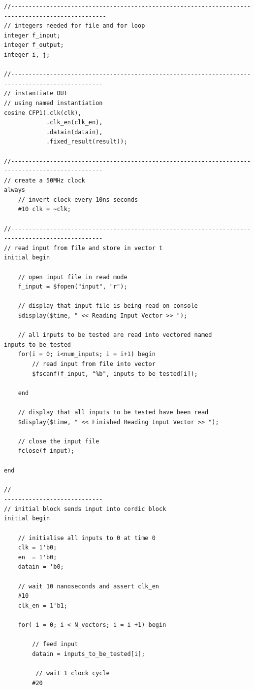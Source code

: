 \documentclass{article}
\begin{document}
\begin{verbatim}
//-------------------------------------------------------------------------------------------------
// integers needed for file and for loop
integer f_input;
integer f_output;
integer i, j;

//------------------------------------------------------------------------------------------------
// instantiate DUT
// using named instantiation
cosine CFP1(.clk(clk),
            .clk_en(clk_en),
            .datain(datain),
            .fixed_result(result));

//------------------------------------------------------------------------------------------------
// create a 50MHz clock
always
    // invert clock every 10ns seconds
    #10 clk = ~clk;
  
//------------------------------------------------------------------------------------------------
// read input from file and store in vector t
initial begin

    // open input file in read mode
    f_input = $fopen("input", "r");
    
    // display that input file is being read on console
    $display($time, " << Reading Input Vector >> ");
    
    // all inputs to be tested are read into vectored named inputs_to_be_tested
    for(i = 0; i<num_inputs; i = i+1) begin
        // read input from file into vector
        $fscanf(f_input, "%b", inputs_to_be_tested[i]);
        
    end
    
    // display that all inputs to be tested have been read
    $display($time, " << Finished Reading Input Vector >> ");
    
    // close the input file
    fclose(f_input);

end

//------------------------------------------------------------------------------------------------
// initial block sends input into cordic block
initial begin 
    
    // initialise all inputs to 0 at time 0
    clk = 1'b0;
    en  = 1'b0;
    datain = 'b0;
    
    // wait 10 nanoseconds and assert clk_en
    #10
    clk_en = 1'b1;
    
    for( i = 0; i < N_vectors; i = i +1) begin
    
        // feed input
        datain = inputs_to_be_tested[i];
        
         // wait 1 clock cycle     
        #20
        

\end{verbatim}
\end{document}
